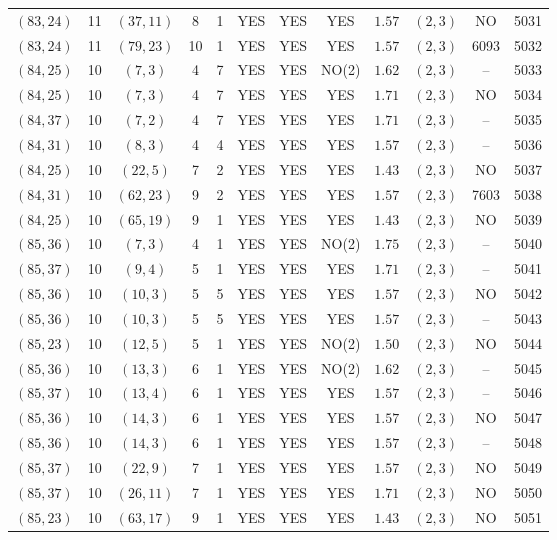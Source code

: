 \begin{longtable}{|c|c|c|c|c|c|c|c|c|c|c|c|}
$(83,24)$ & 11 & $(37,11)$ & 8 & 1 & YES & YES & YES & $1.57$ & $(2,3)$ & NO & 5031\\
$(83,24)$ & 11 & $(79,23)$ & 10 & 1 & YES & YES & YES & $1.57$ & $(2,3)$ & 6093 & 5032\\
$(84,25)$ & 10 & $(7,3)$ & 4 & 7 & YES & YES & NO(2) & $1.62$ & $(2,3)$ & -- & 5033\\
$(84,25)$ & 10 & $(7,3)$ & 4 & 7 & YES & YES & YES & $1.71$ & $(2,3)$ & NO & 5034\\
$(84,37)$ & 10 & $(7,2)$ & 4 & 7 & YES & YES & YES & $1.71$ & $(2,3)$ & -- & 5035\\
$(84,31)$ & 10 & $(8,3)$ & 4 & 4 & YES & YES & YES & $1.57$ & $(2,3)$ & -- & 5036\\
$(84,25)$ & 10 & $(22,5)$ & 7 & 2 & YES & YES & YES & $1.43$ & $(2,3)$ & NO & 5037\\
$(84,31)$ & 10 & $(62,23)$ & 9 & 2 & YES & YES & YES & $1.57$ & $(2,3)$ & 7603 & 5038\\
$(84,25)$ & 10 & $(65,19)$ & 9 & 1 & YES & YES & YES & $1.43$ & $(2,3)$ & NO & 5039\\
$(85,36)$ & 10 & $(7,3)$ & 4 & 1 & YES & YES & NO(2) & $1.75$ & $(2,3)$ & -- & 5040\\
$(85,37)$ & 10 & $(9,4)$ & 5 & 1 & YES & YES & YES & $1.71$ & $(2,3)$ & -- & 5041\\
$(85,36)$ & 10 & $(10,3)$ & 5 & 5 & YES & YES & YES & $1.57$ & $(2,3)$ & NO & 5042\\
$(85,36)$ & 10 & $(10,3)$ & 5 & 5 & YES & YES & YES & $1.57$ & $(2,3)$ & -- & 5043\\
$(85,23)$ & 10 & $(12,5)$ & 5 & 1 & YES & YES & NO(2) & $1.50$ & $(2,3)$ & NO & 5044\\
$(85,36)$ & 10 & $(13,3)$ & 6 & 1 & YES & YES & NO(2) & $1.62$ & $(2,3)$ & -- & 5045\\
$(85,37)$ & 10 & $(13,4)$ & 6 & 1 & YES & YES & YES & $1.57$ & $(2,3)$ & -- & 5046\\
$(85,36)$ & 10 & $(14,3)$ & 6 & 1 & YES & YES & YES & $1.57$ & $(2,3)$ & NO & 5047\\
$(85,36)$ & 10 & $(14,3)$ & 6 & 1 & YES & YES & YES & $1.57$ & $(2,3)$ & -- & 5048\\
$(85,37)$ & 10 & $(22,9)$ & 7 & 1 & YES & YES & YES & $1.57$ & $(2,3)$ & NO & 5049\\
$(85,37)$ & 10 & $(26,11)$ & 7 & 1 & YES & YES & YES & $1.71$ & $(2,3)$ & NO & 5050\\
$(85,23)$ & 10 & $(63,17)$ & 9 & 1 & YES & YES & YES & $1.43$ & $(2,3)$ & NO & 5051\\

\end{longtable}
